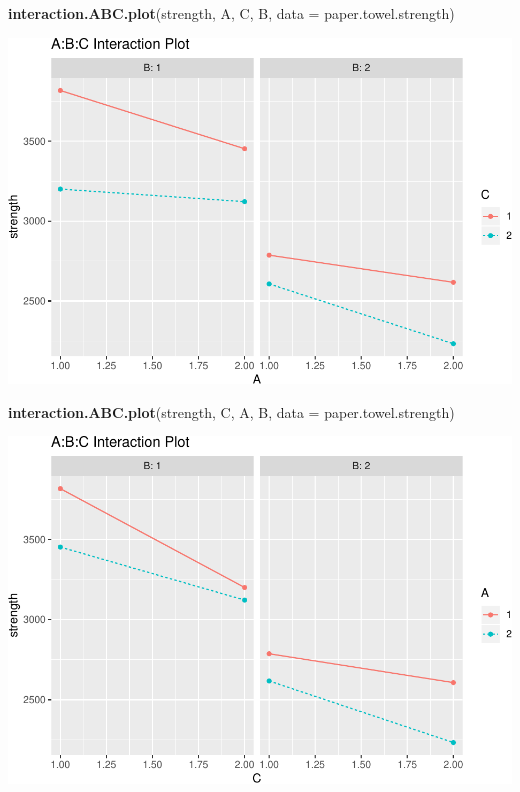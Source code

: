 \documentclass[12pt,]{article}
\newenvironment{Shaded}{\begin{snugshade}}{\end{snugshade}}
\newcommand{\KeywordTok}[1]{\textcolor[rgb]{0.13,0.29,0.53}{\textbf{#1}}}
\newcommand{\DataTypeTok}[1]{\textcolor[rgb]{0.13,0.29,0.53}{#1}}
\newcommand{\NormalTok}[1]{#1}
\begin{document}
\begin{Shaded}
\begin{Highlighting}[]
\KeywordTok{interaction.ABC.plot}\NormalTok{(strength, A, C, B, }\DataTypeTok{data =}\NormalTok{ paper.towel.strength)}
\end{Highlighting}
\end{Shaded}

\includegraphics{Markdown_HW_7_files/figure-latex/unnamed-chunk-2-2.pdf}

\begin{Shaded}
\begin{Highlighting}[]
\KeywordTok{interaction.ABC.plot}\NormalTok{(strength, C, A, B, }\DataTypeTok{data =}\NormalTok{ paper.towel.strength)}
\end{Highlighting}
\end{Shaded}

\includegraphics{Markdown_HW_7_files/figure-latex/unnamed-chunk-2-3.pdf}
\end{document}
